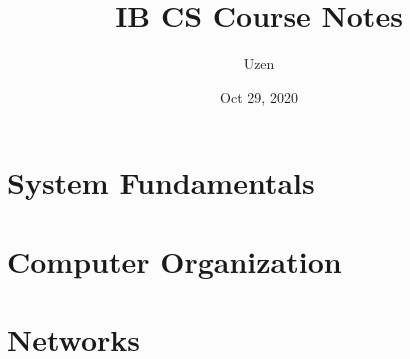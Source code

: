 \documentclass{report}
\title{IB CS Course Notes}
\author{Uzen}
\date{Oct 29, 2020}
\begin{document}
\maketitle
\tableofcontents

\newpage

\chapter{System Fundamentals}


\chapter{Computer Organization}


\chapter{Networks}

\end{document}
